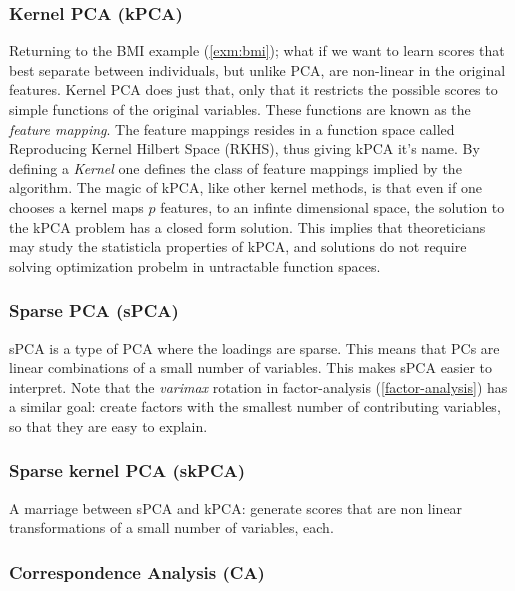 \documentclass[]{book}
\theoremstyle{definition}
\theoremstyle{definition}
\theoremstyle{definition}
\theoremstyle{remark}
\begin{document}
\hypertarget{kernel-pca-kpca}{%
\subsubsection{Kernel PCA (kPCA)}\label{kernel-pca-kpca}}

Returning to the BMI example (\ref{exm:bmi}); what if we want to learn scores that best separate between individuals, but unlike PCA, are non-linear in the original features.
Kernel PCA does just that, only that it restricts the possible scores to simple functions of the original variables.
These functions are known as the \emph{feature mapping}.
The feature mappings resides in a function space called Reproducing Kernel Hilbert Space (RKHS), thus giving kPCA it's name.
By defining a \emph{Kernel} one defines the class of feature mappings implied by the algorithm.
The magic of kPCA, like other kernel methods, is that even if one chooses a kernel maps \(p\) features, to an infinte dimensional space, the solution to the kPCA problem has a closed form solution.
This implies that theoreticians may study the statisticla properties of kPCA, and solutions do not require solving optimization probelm in untractable function spaces.

\hypertarget{sparse-pca-spca}{%
\subsubsection{Sparse PCA (sPCA)}\label{sparse-pca-spca}}

sPCA is a type of PCA where the loadings are sparse.
This means that PCs are linear combinations of a small number of variables.
This makes sPCA easier to interpret.
Note that the \emph{varimax} rotation in factor-analysis (\ref{factor-analysis}) has a similar goal: create factors with the smallest number of contributing variables, so that they are easy to explain.

\hypertarget{sparse-kernel-pca-skpca}{%
\subsubsection{Sparse kernel PCA (skPCA)}\label{sparse-kernel-pca-skpca}}

A marriage between sPCA and kPCA: generate scores that are non linear transformations of a small number of variables, each.

\hypertarget{correspondence-analysis-ca}{%
\subsubsection{Correspondence Analysis (CA)}\label{correspondence-analysis-ca}}
\end{document}
